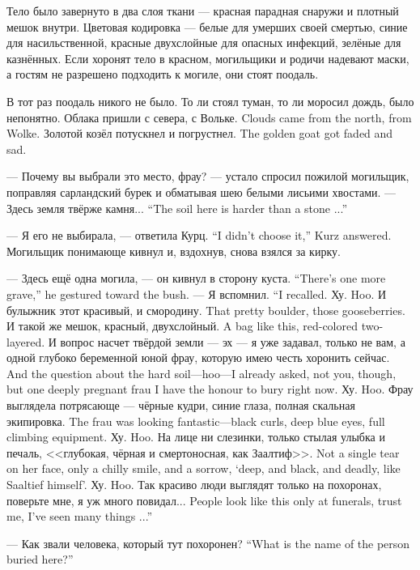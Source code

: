 Тело было завернуто в два слоя ткани --- красная парадная снаружи и плотный мешок внутри.
Цветовая кодировка --- белые для умерших своей смертью, синие для насильственной, красные двухслойные для опасных инфекций, зелёные для казнённых.
Если хоронят тело в красном, могильщики и родичи надевают маски, а гостям не разрешено подходить к могиле, они стоят поодаль.

В тот раз поодаль никого не было.
То ли стоял туман, то ли моросил дождь, было непонятно.
{Облака пришли с севера, с Вольке.}
{Clouds came from the north, from Wolke.}
{Золотой козёл потускнел и погрустнел.}
{The golden goat got faded and sad.}

--- Почему вы выбрали это место, фрау? --- устало спросил пожилой могильщик, поправляя сарландский бурек и обматывая шею белыми лисьими хвостами.
{--- Здесь земля твёрже камня...}
{``The soil here is harder than a stone ...''}

{--- Я его не выбирала, --- ответила Курц.}
{``I didn't choose it,'' Kurz answered.}
Могильщик понимающе кивнул и, вздохнув, снова взялся за кирку.

{--- Здесь ещё одна могила, --- он кивнул в сторону куста.}
{``There's one more grave,'' he gestured toward the bush.}
{--- Я вспомнил.}
{``I recalled.}
{Ху.}
{Hoo.}
{И булыжник этот красивый, и смородину.}
{That pretty boulder, those gooseberries.}
{И такой же мешок, красный, двухслойный.}
{A bag like this, red-colored two-layered.}
{И вопрос насчет твёрдой земли --- эх --- я уже задавал, только не вам, а одной глубоко беременной юной фрау, которую имею честь хоронить сейчас.}
{And the question about the hard soil---hoo---I already asked, not you, though, but one deeply pregnant frau I have the honour to bury right now.}
{Ху.}
{Hoo.}
{Фрау выглядела потрясающе --- чёрные кудри, синие глаза, полная скальная экипировка.}
{The frau was looking fantastic---black curls, deep blue eyes, full climbing equipment.}
{Ху.}
{Hoo.}
{На лице ни слезинки, только стылая улыбка и печаль, <<глубокая, чёрная и смертоносная, как Заалтиф>>.}
{Not a single tear on her face, only a chilly smile, and a sorrow, `deep, and black, and deadly, like Saaltief himself'.}
{Ху.}
{Hoo.}
{Так красиво люди выглядят только на похоронах, поверьте мне, я уж много повидал...}
{People look like this only at funerals, trust me, I've seen many things ...''}

{--- Как звали человека, который тут похоронен?}
{``What is the name of the person buried here?''}

